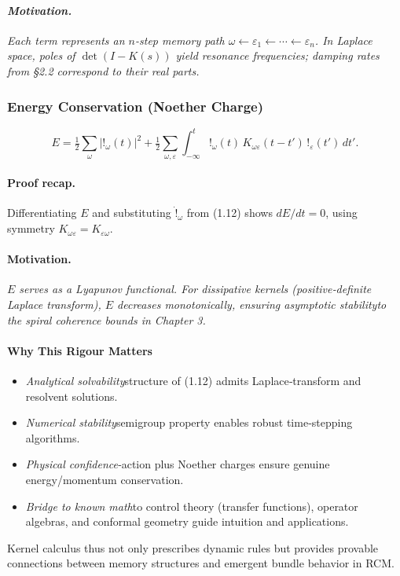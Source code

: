 \paragraph{\textit{Motivation.}}  
\textit{Each term represents an \(n\)-step memory path \(\omega\leftarrow\varepsilon_{1}\leftarrow\cdots\leftarrow\varepsilon_{n}\).  In Laplace space, poles of \(\det(I-K(s))\) yield resonance frequencies; damping rates from §2.2 correspond to their real parts.}

\medskip
\subsubsection{Energy Conservation (Noether Charge)}
\[
  E
  = \tfrac12\sum_{\omega}|!_{\omega}(t)|^{2}
    + \tfrac12\sum_{\omega,\varepsilon}
      \int_{-\infty}^{t}
        !_{\omega}(t)\,K_{\omega\varepsilon}(t-t')\,!_{\varepsilon}(t')\,dt'.
\]

\paragraph{Proof recap.}  
Differentiating \(E\) and substituting \(\dot{!}_{\omega}\) from (1.12) shows \(dE/dt=0\), using symmetry \(K_{\omega\varepsilon}=K_{\varepsilon\omega}\).

\paragraph{\textbf{Motivation.}}  
\textit{\(E\) serves as a Lyapunov functional.  For dissipative kernels (positive‐definite Laplace transform), \(E\) decreases monotonically, ensuring asymptotic stability\emdashkey to the spiral coherence bounds in Chapter 3.}

\medskip
\paragraph{Why This Rigour Matters}
\begin{itemize}
  \item \emph{Analytical solvability}\emdashVolterra structure of (1.12) admits Laplace‐transform and resolvent solutions.
  \item \emph{Numerical stability}\emdashCausal semigroup property enables robust time‐stepping algorithms.
  \item \emph{Physical confidence}\emdashLeast‐action plus Noether charges ensure genuine energy/momentum conservation.
  \item \emph{Bridge to known math}\emdashLinks to control theory (transfer functions), operator algebras, and conformal geometry guide intuition and applications.
\end{itemize}
Kernel calculus thus not only prescribes dynamic rules but provides provable connections
between memory structures and emergent bundle behavior in RCM.

